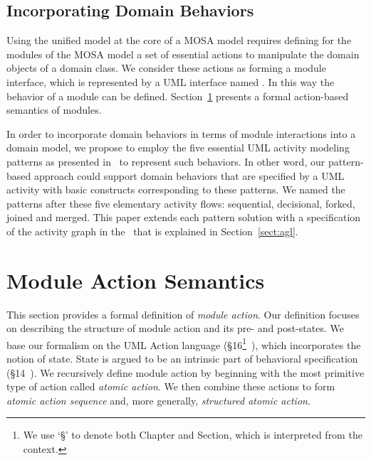 \subsection{Incorporating Domain Behaviors} 
\label{sect:domainBehaviors}

Using the unified model at the core of a MOSA model requires defining for the modules of the MOSA model a set of essential actions to manipulate the domain objects of a domain class.
%
We consider these actions as forming a module interface, which is represented by a UML interface named  . In this way the behavior of a module can be defined. Section~\ref{sect:actSemantics} presents a formal action-based semantics of modules.

In order to incorporate domain behaviors in terms of module interactions into a domain model, we propose to employ the five essential UML activity modeling patterns as presented in~\cite{le_domain_2018} to represent such behaviors. In other word, our pattern-based approach could support domain behaviors that are specified by a UML activity with basic constructs corresponding to these patterns. We named the patterns after these five elementary activity flows: sequential, decisional, forked, joined and merged. This paper extends each pattern solution with a specification of the activity graph in the \agl~that is explained in Section~\ref{sect:agl}. 

\section{Module Action Semantics}
\label{sect:actSemantics}

This section provides a formal definition of \textit{module action}.
Our definition focuses on describing the structure of module action and its pre- and post-states. We base our formalism on the UML Action language (\S{16}\footnote{We use `\S{}' to denote both Chapter and Section, which is interpreted from the context.}~\cite{omg_unified_2015}), which incorporates the notion of state. State is argued to be an intrinsic part of behavioral specification (\S{14}~\cite{omg_unified_2015}).
%
We recursively define module action by beginning with the most primitive type of action called \textit{atomic action}. We then combine these actions to form \textit{atomic action sequence} and, more generally, \textit{structured atomic action}.

